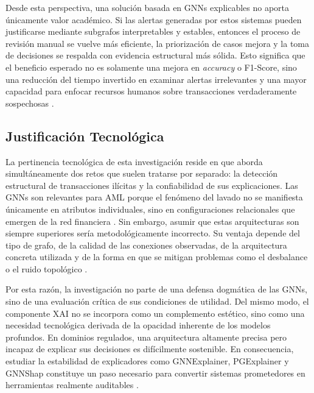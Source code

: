 \bigskip

Desde esta perspectiva, una solución basada en GNNs explicables no aporta únicamente valor académico. Si las alertas generadas por estos sistemas pueden justificarse mediante subgrafos interpretables y estables, entonces el proceso de revisión manual se vuelve más eficiente, la priorización de casos mejora y la toma de decisiones se respalda con evidencia estructural más sólida. Esto significa que el beneficio esperado no es solamente una mejora en \textit{accuracy} o F1-Score, sino una reducción del tiempo invertido en examinar alertas irrelevantes y una mayor capacidad para enfocar recursos humanos sobre transacciones verdaderamente sospechosas \cite{Lawal2025AnDataset, He2026AnDetection}.

\bigskip

\subsection{Justificación Tecnológica}

La pertinencia tecnológica de esta investigación reside en que aborda simultáneamente dos retos que suelen tratarse por separado: la detección estructural de transacciones ilícitas y la confiabilidad de sus explicaciones. Las GNNs son relevantes para AML porque el fenómeno del lavado no se manifiesta únicamente en atributos individuales, sino en configuraciones relacionales que emergen de la red financiera \cite{Weber2019Anti-MoneyForensics, Lawal2025AnDataset}. Sin embargo, asumir que estas arquitecturas son siempre superiores sería metodológicamente incorrecto. Su ventaja depende del tipo de grafo, de la calidad de las conexiones observadas, de la arquitectura concreta utilizada y de la forma en que se mitigan problemas como el desbalance o el ruido topológico \cite{Du2017TopologyNetworks, Menezes2025SemanticDetectors}.

\bigskip

Por esta razón, la investigación no parte de una defensa dogmática de las GNNs, sino de una evaluación crítica de sus condiciones de utilidad. Del mismo modo, el componente XAI no se incorpora como un complemento estético, sino como una necesidad tecnológica derivada de la opacidad inherente de los modelos profundos. En dominios regulados, una arquitectura altamente precisa pero incapaz de explicar sus decisiones es difícilmente sostenible. En consecuencia, estudiar la estabilidad de explicadores como GNNExplainer, PGExplainer y GNNShap constituye un paso necesario para convertir sistemas prometedores en herramientas realmente auditables \cite{Ying2019Gnnexplainer:Networks, Luo2020ParameterizedNetwork, Akkas2024Gnnshap:Values}.

